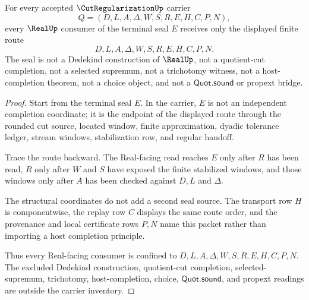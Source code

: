 \begin{theorem}
\label{thm:cut-regularization-real-seal-boundary}
For every accepted $\CutRegularizationUp$ carrier
$$
Q=(D,L,A,\Delta,W,S,R,E,H,C,P,N),
$$
every $\RealUp$ consumer of the terminal seal $E$ receives only the displayed finite route
$$
D,L,A,\Delta,W,S,R,E,H,C,P,N .
$$
The seal is not a Dedekind construction of $\RealUp$, not a quotient-cut completion, not a selected supremum, not a trichotomy witness, not a host-completion theorem, not a choice object, and not a $\mathsf{Quot.sound}$ or propext bridge.
\end{theorem}
\begin{proof}
Start from the terminal seal $E$. In the carrier, $E$ is not an independent completion coordinate; it is the endpoint of the displayed route through the rounded cut source, located window, finite approximation, dyadic tolerance ledger, stream windows, stabilization row, and regular handoff.

Trace the route backward. The Real-facing read reaches $E$ only after $R$ has been read, $R$ only after $W$ and $S$ have exposed the finite stabilized windows, and those windows only after $A$ has been checked against $D,L$ and $\Delta$.

The structural coordinates do not add a second seal source. The transport row $H$ is componentwise, the replay row $C$ displays the same route order, and the provenance and local certificate rows $P,N$ name this packet rather than importing a host completion principle.

Thus every Real-facing consumer is confined to $D,L,A,\Delta,W,S,R,E,H,C,P,N$. The excluded Dedekind construction, quotient-cut completion, selected-supremum, trichotomy, host-completion, choice, $\mathsf{Quot.sound}$, and propext readings are outside the carrier inventory.
\end{proof}


